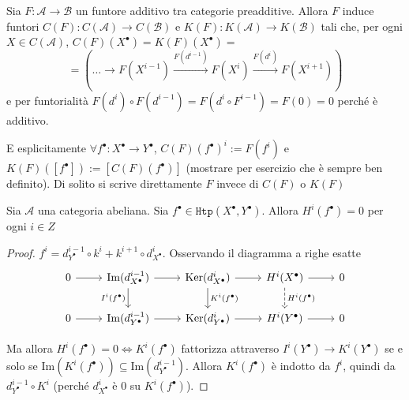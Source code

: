 \begin{remark}{}
    Sia \(F: \mathcal{A} \to \mathcal{B}\) un funtore additivo tra categorie
    preadditive. Allora \(F\) induce funtori \(C{(F)} : C{(\mathcal{A})} \to C
    {(\mathcal{B})}\) e \(K{(F)} : K{(\mathcal{A})} \to K{(\mathcal{B})}\) tali
    che, per ogni \(X \in C{(\mathcal{A})}\), \(C{(F)} {(X^\bullet)} =
    K{(F)}{(X^\bullet)} = \) 
    \[
       = {\left( \dots \to F{(X^{i-1})} \overset{F{(d^{i-1})}}{\to} F{(X^{i})}
       \overset{F{(d^{i})}}{\to} F{(X^{i+1})} \right)} 
    \]
    e per funtorialità \(F{(d^{i})} \circ F{(d^{i-1})} = F{(d^{i} \circ
    F^{i-1})} = F{(0)} = 0\) perché è additivo.

    E esplicitamente \(\forall f^\bullet : X^\bullet \to Y^\bullet\),
    \(C{(F)}{(f^\bullet)}^{i} := F{(f^{i})}\) e \(K{(F)} {([f^\bullet])} :=
    [C{(F)}{(f^\bullet)}]\) (mostrare per esercizio che è sempre ben
    definito). Di solito si scrive direttamente \(F\) invece di \(C{(F)}\) o
    \(K{(F)}\) 
\end{remark}

\begin{lemma}{}
    Sia \(\mathcal{A}\) una categoria abeliana. Sia \(f^\bullet \in
    \mathtt{Htp}{(X^\bullet, Y^\bullet)}\). Allora \(H^{i}{(f^\bullet)} = 0\)
    per ogni \(i \in Z\) 
\end{lemma}
\begin{proof}{}
    \(f^{i} = d_{Y^\bullet} ^{i-1} \circ k^{i} + k^{i+1} \circ
    d_{X^\bullet}^{i}\). Osservando il diagramma a righe esatte
\[ \begin{tikzcd}
	0 & \mathrm{Im}{(d_{X^\bullet} ^{i-1})} & \mathrm{Ker}{(d_{X^\bullet} ^{i})}
      & H^{i}{(X^\bullet)} & 0 \\
	0 & \mathrm{Im}{(d_{Y^\bullet} ^{i-1})} & \mathrm{Ker}{(d_{Y^\bullet} ^{i})}
      & H^{i}{(Y^\bullet)} & 0
	\arrow[from=1-1, to=1-2]
	\arrow[from=1-2, to=1-3]
	\arrow["I^{i}{(f^\bullet)}"', from=1-2, to=2-2]
	\arrow[from=1-3, to=1-4]
	\arrow["K^{i}{(f^\bullet)}", from=1-3, to=2-3]
	\arrow[from=1-4, to=1-5]
	\arrow["{H^i(f^\bullet)}", dashed, from=1-4, to=2-4]
	\arrow[from=2-1, to=2-2]
	\arrow[from=2-2, to=2-3]
	\arrow[from=2-3, to=2-4]
	\arrow[from=2-4, to=2-5]
\end{tikzcd} \]

Ma allora \(H^{i}{(f^\bullet)} = 0 \iff K^{i}{(f^\bullet)}\) fattorizza
attraverso \(I^{i}{(Y^\bullet)} \to K^{i}{(Y^\bullet)}\) se e solo se
\(\mathrm{Im}{(K^{i}{(f^\bullet)})} \subseteq \mathrm{Im}{(d_{Y^\bullet}
^{i-1})} \). Allora \(K^{i}{(f^\bullet)}\) è indotto da \(f^{i}\), quindi da
\(d_{Y^\bullet} ^{i-1} \circ K^{i}\) (perché \(d_{X^\bullet} ^{i}\) è 0 su
\(K^{i}{(f^\bullet)}\)).
\end{proof} 

